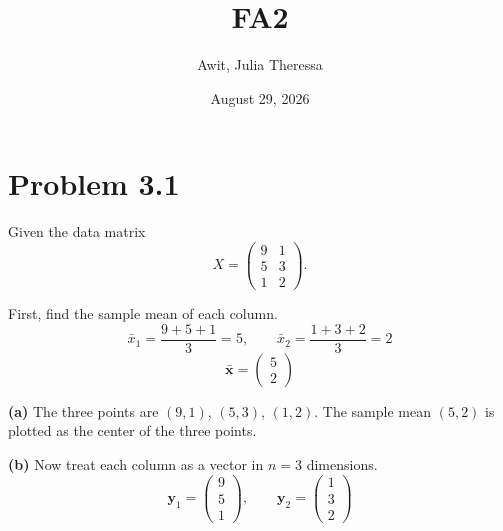 \documentclass[11pt]{article}
\title{FA2}
\author{Awit, Julia Theressa}
\date{August 29, 2026}
\begin{document}
\maketitle

\section*{Problem 3.1}

Given the data matrix
\[
X=\begin{pmatrix} 9 & 1 \\ 5 & 3 \\ 1 & 2\end{pmatrix}.
\]

First, find the sample mean of each column.
\[
\bar x_1=\frac{9+5+1}{3}=5, \qquad \bar x_2=\frac{1+3+2}{3}=2
\]
\[
\bar{\mathbf x}=\begin{pmatrix}5\\2\end{pmatrix}
\]

\textbf{(a)} The three points are $(9,1)$, $(5,3)$, $(1,2)$. The sample mean $(5,2)$ is
plotted as the center of the three points.

\begin{center}
\end{center}

\textbf{(b)} Now treat each column as a vector in $n=3$ dimensions.
\[
\mathbf y_1=\begin{pmatrix}9\\5\\1\end{pmatrix},\qquad
\mathbf y_2=\begin{pmatrix}1\\3\\2\end{pmatrix}
\]
\end{document}
